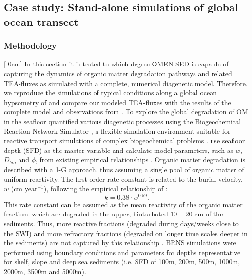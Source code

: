 \documentclass[gmd, manuscript]{copernicus}
\begin{document}
\subsection{Case study: Stand-alone simulations of global ocean transect}\label{subsec:globalhypsometry}
\subsubsection{Methodology}
[-0cm]%
In this section it is tested to which degree OMEN-SED is capable of capturing the dynamics of organic matter degradation pathways and related TEA-fluxes as simulated with a complete, numerical diagenetic model. 
Therefore, we reproduce the simulations of typical conditions along a global ocean hypsometry of \citet{thullner_global_scale_2009} and compare our modeled TEA-fluxes with the results of the complete model and observations 
from \citet{middelburg_denitrification_1996}. To explore the global degradation of OM in the seafloor 
\citet{thullner_global_scale_2009} quantified various diagenetic processes using the Biogeochemical Reaction Network Simulator \citep[BRNS,][]{aguilera_knowledge-based_2005}, 
a flexible simulation environment suitable for reactive transport simulations of complex biogeochemical problems \citep[e.g.][]{jourabchi_quantitative_2005, thullner_modeling_2005}. 
\citet{thullner_global_scale_2009} use seafloor depth (SFD) as the master variable and calculate model parameters, such as $w$, $D_{bio}$ and $\phi$, from existing empirical relationships 
\citep[e.g.][]{van1995metal, middelburg_empirical_1997}. 
Organic matter degradation is described with a 1-G approach, thus assuming a single pool of organic matter of uniform reactivity. 
The first order rate constant is related to the burial velocity, $w$ (cm year$^{-1}$), following the empirical relationship of \citet{boudreau1997diagenetic}:
\begin{equation}
 k=0.38\cdot w^{0.59}.
\end{equation}
This rate constant can be assumed as the mean reactivity of the organic matter fractions which are degraded in the upper, bioturbated $10-20$ cm of the sediments. 
Thus, more reactive fractions (degraded during days/weeks close to the SWI) and more refractory fractions (degraded on longer time scales deeper in the sediments) are not captured by this relationship \citep{boudreau1997diagenetic}. 
BRNS simulations were performed using boundary conditions and parameters for depths representative for shelf, slope and deep sea sediments (i.e. SFD of 100m, 200m, 500m, 1000m, 2000m, 3500m and 5000m). 
\end{document}
